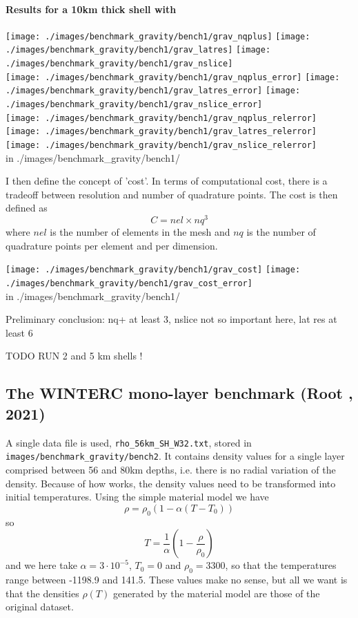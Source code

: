 \paragraph{Results for a 10km thick shell with \aspect{}}

\begin{center}
\texttt{[image: ./images/benchmark\_gravity/bench1/grav\_nqplus]}
\texttt{[image: ./images/benchmark\_gravity/bench1/grav\_latres]}
\texttt{[image: ./images/benchmark\_gravity/bench1/grav\_nslice]}\\
\texttt{[image: ./images/benchmark\_gravity/bench1/grav\_nqplus\_error]}
\texttt{[image: ./images/benchmark\_gravity/bench1/grav\_latres\_error]}
\texttt{[image: ./images/benchmark\_gravity/bench1/grav\_nslice\_error]}\\
\texttt{[image: ./images/benchmark\_gravity/bench1/grav\_nqplus\_relerror]}
\texttt{[image: ./images/benchmark\_gravity/bench1/grav\_latres\_relerror]}
\texttt{[image: ./images/benchmark\_gravity/bench1/grav\_nslice\_relerror]}\\
{\tiny {\color{gray} in ./images/benchmark\_gravity/bench1/}}
\end{center}

I then define the concept of 'cost'. In terms of computational cost, there is a tradeoff between resolution and 
number of quadrature points. The cost is then defined as 
\[
C = nel \times nq^3
\]
where $nel$ is the number of elements in the mesh and $nq$ is the number of quadrature points per element
and per dimension.


\begin{center}
\texttt{[image: ./images/benchmark\_gravity/bench1/grav\_cost]}
\texttt{[image: ./images/benchmark\_gravity/bench1/grav\_cost\_error]}\\
{\tiny {\color{gray} in ./images/benchmark\_gravity/bench1/}}
\end{center}

Preliminary conclusion: nq+ at least 3, nslice not so important here, lat res at least 6


TODO RUN 2 and 5 km shells !


\newpage
\subsection{The WINTERC mono-layer benchmark (Root \etal, 2021)}

A single data file is used,  {\tt rho\_56km\_SH\_W32.txt}, 
stored in {\tt images/benchmark\_gravity/bench2}. 
It contains density values for a single layer comprised between 56 and 80km depths, 
i.e. there is no radial variation of the density. 
Because of how \aspect{} works, the density values need to be transformed into 
initial temperatures. Using the simple material model we have
\[
\rho = \rho_0 (1-\alpha(T-T_0))
\]
so 
\[
T= \frac{1}{\alpha} \left(1 - \frac{\rho}{\rho_0} \right)
\]
and we here take $\alpha = 3\cdot 10^{-5}$, $T_0=0$ and $\rho_0=3300$, so that 
the temperatures range between -1198.9 and  141.5. These values make no sense, 
but all we want is that the densities $\rho(T)$ generated by the material model 
are those of the original dataset. 

